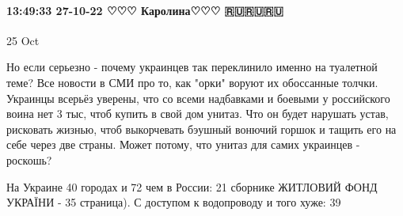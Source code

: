 \paragraph{13:49:33 27-10-22 ♡♡♡ Каролина♡♡♡ 🇷🇺🇷🇺🇷🇺}
25 Oct

Но если серьезно - почему украинцев так переклинило именно на туалетной теме?
Все новости в СМИ про то, как "орки" воруют их обоссанные толчки. Украинцы
всерьёз уверены, что со всеми надбавками и боевыми у российского воина нет 3
тыс, чтоб купить в свой дом унитаз. Что он будет нарушать устав, рисковать
жизнью, чтоб выкорчевать бэушный вонючий горшок и тащить его на себе через две
страны. Может потому, что унитаз для самих украинцев - роскошь?

На Украине 40%
городах и 72%
чем в России: 21%
сборнике ЖИТЛОВИЙ ФОНД УКРАЇНИ - 35 страница). С доступом к водопроводу и того
хуже: 39%

